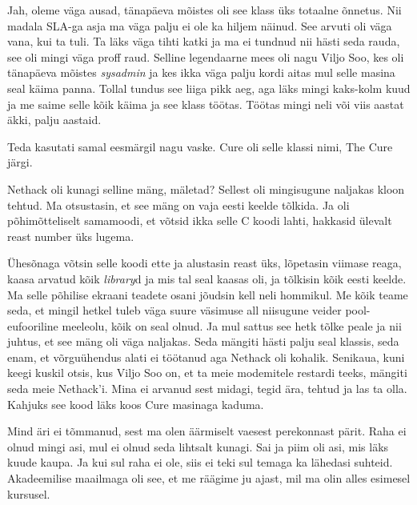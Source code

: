 Jah, oleme väga ausad, tänapäeva mõistes oli see klass üks totaalne õnnetus. Nii 
madala SLA-ga asja ma  väga palju ei ole ka hiljem näinud. See arvuti oli väga 
vana, kui ta tuli. Ta läks väga tihti katki ja ma ei tundnud nii hästi seda 
rauda, see oli mingi väga proff raud. Selline legendaarne mees oli nagu Viljo 
Soo, kes oli tänapäeva mõistes \emph{sysadmin} ja kes 
ikka  väga palju kordi aitas mul selle masina seal käima panna. Tollal tundus 
see liiga pikk aeg,  aga läks mingi kaks-kolm kuud ja me 
saime selle kõik käima ja see klass töötas. Töötas mingi neli või 
viis aastat äkki, palju aastaid. 

Teda kasutati  samal eesmärgil nagu vaske. Cure 
oli selle klassi nimi, The Cure järgi. 

Nethack oli kunagi selline mäng, mäletad? Sellest oli 
mingisugune naljakas kloon tehtud. Ma otsustasin, et see mäng on vaja eesti keelde 
tõlkida. Ja oli põhimõtteliselt samamoodi, et võtsid ikka selle C koodi lahti, 
hakkasid ülevalt reast number üks lugema.


Ühesõnaga võtsin selle koodi ette ja alustasin reast üks, lõpetasin viimase 
reaga, kaasa arvatud kõik \emph{library}d ja mis tal seal kaasas oli, ja 
tõlkisin  kõik eesti keelde. Ma selle põhilise ekraani teadete osani jõudsin 
kell neli hommikul. Me kõik teame seda, et mingil hetkel tuleb  
väga suure väsimuse all niisugune veider pool-eufooriline meeleolu, kõik on 
seal olnud. Ja mul sattus see hetk tõlke peale ja nii juhtus, et see 
mäng oli väga naljakas. Seda mängiti hästi palju seal klassis, seda enam, et 
võrguühendus alati ei töötanud aga Nethack oli kohalik. Senikaua, 
kuni keegi kuskil otsis, kus Viljo Soo on, et ta meie 
modemitele restardi teeks, mängiti seda meie Nethack'i. Mina ei arvanud sest 
midagi, tegid ära, tehtud ja las ta olla. Kahjuks see kood läks koos Cure 
masinaga kaduma.


Mind äri ei tõmmanud, sest ma olen äärmiselt vaesest perekonnast pärit. Raha ei 
olnud mingi asi, mul ei olnud seda lihtsalt kunagi. Sai ja piim oli asi, mis 
läks kuude kaupa. Ja kui sul raha ei ole, siis ei teki sul temaga ka lähedasi 
suhteid. Akadeemilise maailmaga oli see, et me räägime ju ajast, mil ma olin 
alles esimesel kursusel.

